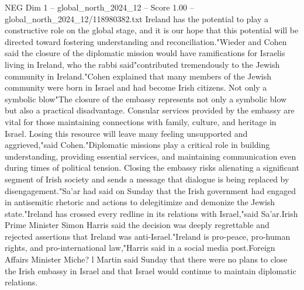 \begin{textsample}{NEG Dim 1 – global\_north\_2024\_12 – Score 1.00 – global\_north\_2024\_12/118980382.txt}
Ireland has the potential to play a constructive role on the global stage, and it is our hope that this potential will be directed toward fostering understanding and reconciliation."Wieder and Cohen said the closure of the diplomatic mission would have ramifications for Israelis living in Ireland, who the rabbi said"contributed tremendously to the Jewish community in Ireland."Cohen explained that many members of the Jewish community were born in Israel and had become Irish citizens.
Not only a symbolic blow"The closure of the embassy represents not only a symbolic blow but also a practical disadvantage.
Consular services provided by the embassy are vital for those maintaining connections with family, culture, and heritage in Israel.
Losing this resource will leave many feeling unsupported and aggrieved,"said Cohen."Diplomatic missions play a critical role in building understanding, providing essential services, and maintaining communication even during times of political tension.
Closing the embassy risks alienating a significant segment of Irish society and sends a message that dialogue is being replaced by disengagement."Sa'ar had said on Sunday that the Irish government had engaged in antisemitic rhetoric and actions to delegitimize and demonize the Jewish state."Ireland has crossed every redline in its relations with Israel,"said Sa'ar.Irish Prime Minister Simon Harris said the decision was deeply regrettable and rejected assertions that Ireland was anti-Israel."Ireland is pro-peace, pro-human rights, and pro-international law,"Harris said in a social media post.Foreign Affairs Minister Miche? l Martin said Sunday that there were no plans to close the Irish embassy in Israel and that Israel would continue to maintain diplomatic relations.

\end{textsample}
